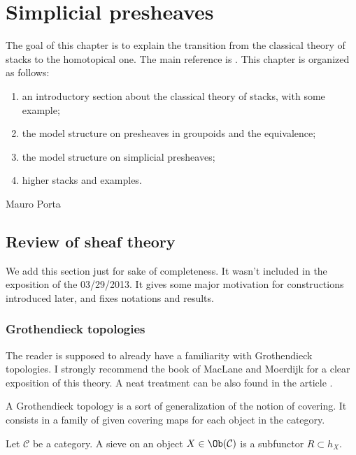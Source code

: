 \chapter{Simplicial presheaves}

The goal of this chapter is to explain the transition from the classical theory of stacks to the homotopical one. The main reference is . This chapter is organized as follows:
\begin{enumerate}
\item an introductory section about the classical theory of stacks, with some example;
\item the model structure on presheaves in groupoids and the equivalence;
\item the model structure on simplicial presheaves;
\item higher stacks and examples.
\end{enumerate}

\begin{flushright}
Mauro Porta
\end{flushright}

\section{Review of sheaf theory}

We add this section just for sake of completeness. It wasn't included in the exposition of the 03/29/2013. It gives some major motivation for constructions introduced later, and fixes notations and results.

\subsection{Grothendieck topologies}

The reader is supposed to already have a familiarity with Grothendieck topologies. I strongly recommend the book of MacLane and Moerdijk  for a clear exposition of this theory. A neat treatment can be also found in the article .

A Grothendieck topology is a sort of generalization of the notion of covering. It consists in a family of given covering maps for each object in the category.

\begin{defin}
Let $\mathcal C$ be a category. A sieve on an object $X \in \Ob(\mathcal C)$ is a subfunctor $R \subset h_X$.
\end{defin}

